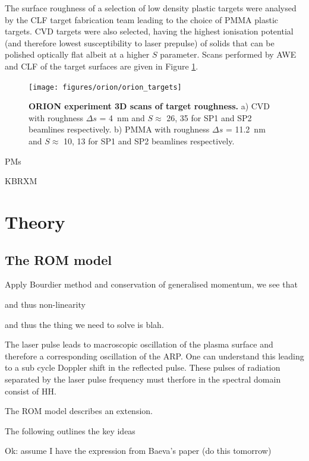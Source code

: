The surface roughness of a selection of low density plastic targets were analysed by the CLF target fabrication team leading to the choice of PMMA plastic targets. CVD targets were also selected, having the highest ionisation potential (and therefore lowest susceptibility to laser prepulse) of solids that can be polished optically flat albeit at a higher $S$ parameter. Scans performed by AWE and CLF of the target surfaces are given in Figure \ref{fig:oriontargets}.
\begin{figure}
	\centering
	\texttt{[image: figures/orion/orion\_targets]}
	\caption[ORION HHG experiment targets]{\textbf{ORION experiment 3D scans of target roughness.} a) CVD with roughness $\Delta s$ = \qty{4}{nm} and $S \approx$ 26, 35 for SP1 and SP2 beamlines respectively. b) PMMA with roughness $\Delta s$ = \qty{11.2}{nm} and $S \approx$ 10, 13 for SP1 and SP2 beamlines respectively.}
	\label{fig:oriontargets}
\end{figure}

PMs

KBRXM

\section{\label{ch:3-sec:theory}Theory}




\subsection{The ROM model}

Apply Bourdier method and conservation of generalised momentum, we see that 

and thus non-linearity

and thus the thing we need to solve is blah.


The laser pulse leads to macroscopic oscillation of the plasma surface and therefore a corresponding oscillation of the ARP. One can understand this leading to a sub cycle Doppler shift in the reflected pulse. These pulses of radiation separated by the laser pulse frequency must therfore in the spectral domain consist of HH.

The \ac{ROM} model describes an extension. 

The following outlines the key ideas 

Ok: assume I have the expression from Baeva's paper (do this tomorrow)

